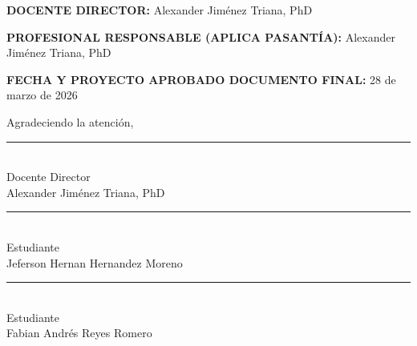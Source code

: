\documentclass[12pt,letterpaper]{article}
\begin{document}
\vspace{0.1cm}

\noindent
\textbf{DOCENTE DIRECTOR:} Alexander Jiménez Triana, PhD

\vspace{0.15cm}

\noindent
\textbf{PROFESIONAL RESPONSABLE (APLICA PASANTÍA):} Alexander Jiménez Triana, PhD

\vspace{0.15cm}

\noindent
\textbf{FECHA Y PROYECTO APROBADO DOCUMENTO FINAL:} 28 de marzo de 2026

\vspace{0.3cm}

\noindent
Agradeciendo la atención,

\vspace{0.7cm}

\begin{minipage}[t]{0.45\textwidth}
    \noindent
    \rule{6cm}{0.4pt}\\
    Docente Director\\
    Alexander Jiménez Triana, PhD
\end{minipage}

\vspace{0.7cm}


\vspace{0.7cm}

\begin{minipage}[t]{0.45\textwidth}
    \noindent
    \rule{6cm}{0.4pt}\\
    Estudiante\\
    Jeferson Hernan Hernandez Moreno
\end{minipage}
\hfill
\begin{minipage}[t]{0.45\textwidth}
    \noindent
    \rule{6cm}{0.4pt}\\
    Estudiante\\
    Fabian Andrés Reyes Romero
\end{minipage}
\end{document}
